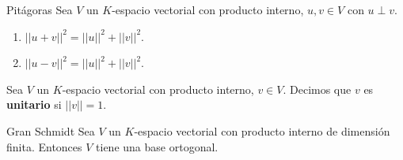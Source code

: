 \begin{lemma}{Pitágoras}{}
    Sea $V$ un $K$-espacio vectorial con producto interno, $u,v \in V$ con $u \perp v$.
    \begin{enumerate}
        \item $||u+v||^2 = ||u||^2 + ||v||^2$.
        \item $||u-v||^2 = ||u||^2 + ||v||^2$.
    \end{enumerate}
\end{lemma}
\begin{definition}{}{}
    Sea $V$ un $K$-espacio vectorial con producto interno, $v \in V$. Decimos que $v$ es \textbf{unitario} si $||v|| = 1$.
\end{definition}
\begin{theorem}{Gran Schmidt}{}
    Sea $V$ un $K$-espacio vectorial con producto interno de dimensión finita. Entonces $V$ tiene una base ortogonal.
\end{theorem}
